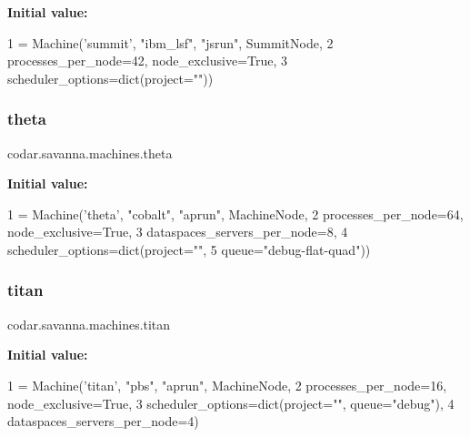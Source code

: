 {\bfseries Initial value\+:}
\begin{DoxyCode}
1 =  Machine(\textcolor{stringliteral}{'summit'}, \textcolor{stringliteral}{"ibm\_lsf"}, \textcolor{stringliteral}{"jsrun"}, SummitNode,
2                  processes\_per\_node=42, node\_exclusive=\textcolor{keyword}{True},
3                  scheduler\_options=dict(project=\textcolor{stringliteral}{""}))
\end{DoxyCode}
\mbox{\label{namespacecodar_1_1savanna_1_1machines_aa6fd3932b348a23c463f4f1d81e3a130}} 
\subsubsection{\texorpdfstring{theta}{theta}}
{\footnotesize\ttfamily codar.\+savanna.\+machines.\+theta}

{\bfseries Initial value\+:}
\begin{DoxyCode}
1 =  Machine(\textcolor{stringliteral}{'theta'}, \textcolor{stringliteral}{"cobalt"}, \textcolor{stringliteral}{"aprun"}, MachineNode,
2                 processes\_per\_node=64, node\_exclusive=\textcolor{keyword}{True},
3                 dataspaces\_servers\_per\_node=8,
4                 scheduler\_options=dict(project=\textcolor{stringliteral}{""},
5                                        queue=\textcolor{stringliteral}{"debug-flat-quad"}))
\end{DoxyCode}
\mbox{\label{namespacecodar_1_1savanna_1_1machines_ad70e3909df8e02f3a0cb9ab6aff13ce5}} 
\subsubsection{\texorpdfstring{titan}{titan}}
{\footnotesize\ttfamily codar.\+savanna.\+machines.\+titan}

{\bfseries Initial value\+:}
\begin{DoxyCode}
1 =  Machine(\textcolor{stringliteral}{'titan'}, \textcolor{stringliteral}{"pbs"}, \textcolor{stringliteral}{"aprun"}, MachineNode,
2                 processes\_per\_node=16, node\_exclusive=\textcolor{keyword}{True},
3                 scheduler\_options=dict(project=\textcolor{stringliteral}{""}, queue=\textcolor{stringliteral}{"debug"}),
4                 dataspaces\_servers\_per\_node=4)
\end{DoxyCode}
